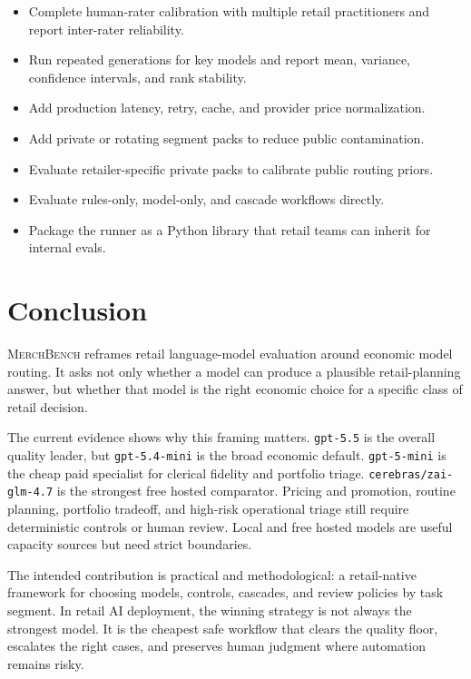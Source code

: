 \documentclass[11pt]{article}
\newcommand{\benchmark}{\textsc{MerchBench}}
\newcommand{\code}[1]{\texttt{#1}}
\begin{document}
\begin{itemize}[leftmargin=*]
  \item Complete human-rater calibration with multiple retail practitioners and report inter-rater reliability.
  \item Run repeated generations for key models and report mean, variance, confidence intervals, and rank stability.
  \item Add production latency, retry, cache, and provider price normalization.
  \item Add private or rotating segment packs to reduce public contamination.
  \item Evaluate retailer-specific private packs to calibrate public routing priors.
  \item Evaluate rules-only, model-only, and cascade workflows directly.
  \item Package the runner as a Python library that retail teams can inherit for internal evals.
\end{itemize}

\section{Conclusion}

\benchmark{} reframes retail language-model evaluation around economic model routing. It asks not only whether a model can produce a plausible retail-planning answer, but whether that model is the right economic choice for a specific class of retail decision.

The current evidence shows why this framing matters. \code{gpt-5.5} is the overall quality leader, but \code{gpt-5.4-mini} is the broad economic default. \code{gpt-5-mini} is the cheap paid specialist for clerical fidelity and portfolio triage. \code{cerebras/zai-glm-4.7} is the strongest free hosted comparator. Pricing and promotion, routine planning, portfolio tradeoff, and high-risk operational triage still require deterministic controls or human review. Local and free hosted models are useful capacity sources but need strict boundaries.

The intended contribution is practical and methodological: a retail-native framework for choosing models, controls, cascades, and review policies by task segment. In retail AI deployment, the winning strategy is not always the strongest model. It is the cheapest safe workflow that clears the quality floor, escalates the right cases, and preserves human judgment where automation remains risky.
\end{document}
